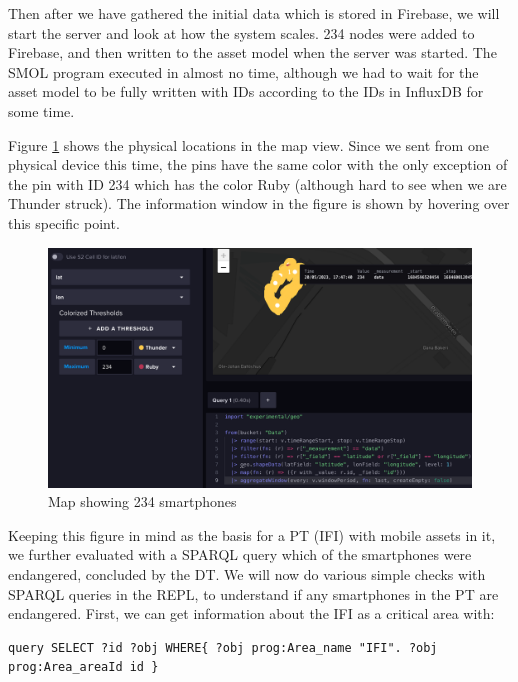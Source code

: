 \documentclass{article}
\begin{document}
Then after we have gathered the initial data which is stored in Firebase, we will start the server and look at how the system scales. 234 nodes were added to Firebase, and then written to the asset model when the server was started. The SMOL program executed in almost no time, although we had to wait for the asset model to be fully written with IDs according to the IDs in InfluxDB for some time.

Figure \ref{fig:234_smartphones_map} shows the physical locations in the map view. Since we sent from one physical device this time, the pins have the same color with the only exception of the pin with ID 234 which has the color Ruby (although hard to see when we are Thunder struck). The information window in the figure is shown by hovering over this specific point.

\begin{figure}[H]
    \centering
    \includegraphics[scale=0.30]{graphics/234_smartphones_map.png}
    \caption{Map showing 234 smartphones}
    \label{fig:234_smartphones_map}
\end{figure}

Keeping this figure in mind as the basis for a PT (IFI) with mobile assets in it, we further evaluated with a SPARQL query which of the smartphones were endangered, concluded by the DT.
We will now do various simple checks with SPARQL queries in the REPL, to understand if any smartphones in the PT are endangered. First, we can get information about the IFI as a critical area with:
\newline
\begin{small}
\begin{Verbatim}[breaklines]
query SELECT ?id ?obj WHERE{ ?obj prog:Area_name "IFI". ?obj prog:Area_areaId id }
\end{Verbatim}
\end{small}
\end{document}
